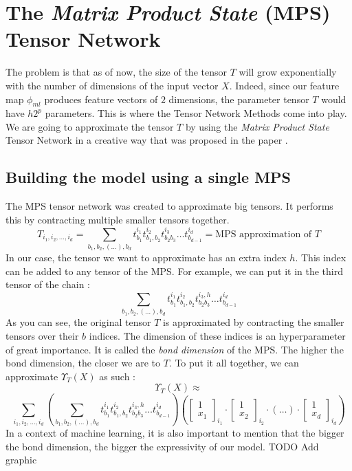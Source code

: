 \documentclass{article}
\theoremstyle{definition}
\theoremstyle{definition}
\begin{document}
\section{The \emph{Matrix Product State} (MPS) Tensor Network}
The problem is that as of now, the size of the tensor $T$ will grow exponentially with the number of dimensions of the input vector $X$. Indeed, since our feature map $\phi_{ml}$ produces feature vectors of $2$ dimensions, the parameter tensor $T$ would have $h2^p$ parameters. This is where the Tensor Network Methods come into play. We are going to approximate the tensor $T$ by using the \emph{Matrix Product State} Tensor Network in a creative way that was proposed in the paper \cite{stoudenmire2017supervised}.
\subsection{Building the model using a single MPS}
The MPS tensor network was created to approximate big tensors. It performs this by contracting multiple smaller tensors together.
\begin{equation} \label{eq:mps_approx}
T_{i_1, i_2, \dots, i_d} 
= 
\sum_{b_1,b_2,(\dots), b_d} t^{i_1}_{b_1} t^{i_2}_{b_1, b_2} t^{i_3}_{b_2 b_3} \dots  t^{i_d}_{ b_{d-1} } 
= \text{MPS approximation of $T$}
\end{equation}
In our case, the tensor we want to approximate has an extra index $h$. This index can be added to any tensor of the MPS. For example, we can put it in the third tensor of the chain :
\[
    \sum_{b_1,b_2,(\dots), b_d} t^{i_1}_{b_1} t^{i_2}_{b_1, b_2} t^{i_3, h}_{b_2 b_3} \dots  t^{i_d}_{ b_{d-1} } 
\]
As you can see, the original tensor $T$ is approximated by contracting the smaller tensors over their $b$ indices. The dimension of these indices is an hyperparameter of great importance. It is called the \emph{bond dimension} of the MPS. The higher the bond dimension, the closer we are to $T$. To put it all together, we can approximate $\Upsilon_T(X)$ as such :
\[
    \Upsilon_T(X) \approx
\]
\[
    \sum_{i_1, i_2, \dots, i_d}
    \left(
    \sum_{b_1,b_2,(\dots), b_d} t^{i_1}_{b_1} t^{i_2}_{b_1, b_2} t^{i_3, h}_{b_2 b_3} \dots  t^{i_d}_{ b_{d-1} } 
    \right)
    \left(
    \begin{bmatrix}
        1 \\ x_1
    \end{bmatrix}_{i_1}
    \cdot
    \begin{bmatrix}
        1 \\ x_2
    \end{bmatrix}_{i_2}
    \cdot
    (\dots)
    \cdot
    \begin{bmatrix}
        1 \\ x_d
    \end{bmatrix}_{i_d}
    \right)
\]
In a context of machine learning, it is also important to mention that the bigger the bond dimension, the bigger the expressivity of our model.
TODO Add graphic
\end{document}
